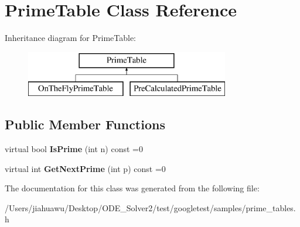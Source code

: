 \hypertarget{class_prime_table}{}\section{Prime\+Table Class Reference}
\label{class_prime_table}
Inheritance diagram for Prime\+Table\+:\begin{figure}[H]
\begin{center}
\leavevmode
\includegraphics[height=2.000000cm]{class_prime_table}
\end{center}
\end{figure}
\subsection*{Public Member Functions}
\begin{DoxyCompactItemize}
\item 
\mbox{\label{class_prime_table_a2ab9243364ded0c51541f641b2df362a}} 
virtual bool {\bfseries Is\+Prime} (int n) const =0
\item 
\mbox{\label{class_prime_table_ae537c939f56617d8937d57bbbae3ab30}} 
virtual int {\bfseries Get\+Next\+Prime} (int p) const =0
\end{DoxyCompactItemize}


The documentation for this class was generated from the following file\+:\begin{DoxyCompactItemize}
\item 
/\+Users/jiahuawu/\+Desktop/\+O\+D\+E\+\_\+\+Solver2/test/googletest/samples/prime\+\_\+tables.\+h\end{DoxyCompactItemize}
